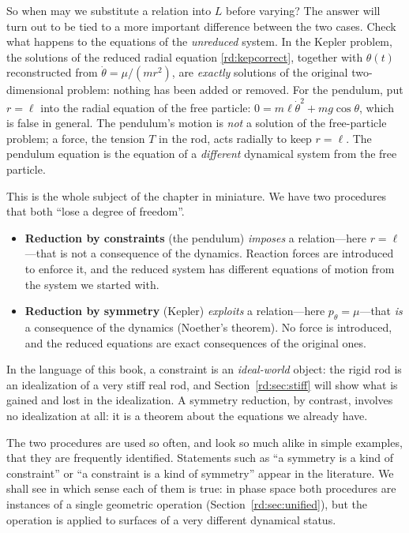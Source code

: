 So when may we substitute a relation into $L$ before varying? The answer will turn out to be tied to a more important difference between the two cases. Check what happens to the equations of the \emph{unreduced} system. In the Kepler problem, the solutions of the reduced radial equation \eqref{rd:kepcorrect}, together with $\theta(t)$ reconstructed from $\dot\theta=\mu/(mr^2)$, are \emph{exactly} solutions of the original two-dimensional problem: nothing has been added or removed. For the pendulum, put $r=\ell$ into the radial equation of the free particle: $0=m\ell\dot\theta^2+mg\cos\theta$, which is false in general. The pendulum's motion is \emph{not} a solution of the free-particle problem; a force, the tension $T$ in the rod, acts radially to keep $r=\ell$. The pendulum equation is the equation of a \emph{different} dynamical system from the free particle.

\medskip
This is the whole subject of the chapter in miniature. We have two procedures that both ``lose a degree of freedom''.

\begin{itemize}
\item \textbf{Reduction by constraints} (the pendulum) \emph{imposes} a relation---here $r=\ell$---that is not a consequence of the dynamics. Reaction forces are introduced to enforce it, and the reduced system has different equations of motion from the system we started with.
\item \textbf{Reduction by symmetry} (Kepler) \emph{exploits} a relation---here $p_\theta=\mu$---that \emph{is} a consequence of the dynamics (Noether's theorem). No force is introduced, and the reduced equations are exact consequences of the original ones.
\end{itemize}

In the language of this book, a constraint is an \emph{ideal-world} object: the rigid rod is an idealization of a very stiff real rod, and Section~\ref{rd:sec:stiff} will show what is gained and lost in the idealization. A symmetry reduction, by contrast, involves no idealization at all: it is a theorem about the equations we already have.

\medskip
The two procedures are used so often, and look so much alike in simple examples, that they are frequently identified. Statements such as ``a symmetry is a kind of constraint'' or ``a constraint is a kind of symmetry'' appear in the literature. We shall see in which sense each of them is true: in phase space both procedures are instances of a single geometric operation (Section~\ref{rd:sec:unified}), but the operation is applied to surfaces of a very different dynamical status.

